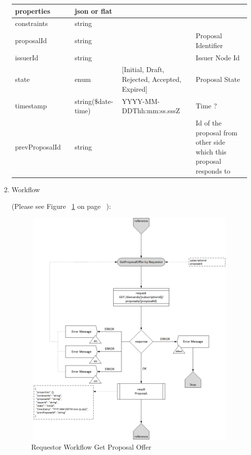 \begin{enumerate}
\begin{center}
\begin{tabular}{|p{3cm}|l|p{3cm}|p{3cm}|p{4cm}|}
properties	& 	& 	json or flat		&								&	 \\ 

\hline

constraints &	&	string				&								&	\\

\hline

proposalId	&	&	string				&								& Proposal Identifier \\

\hline

issuerId	&	&	string				&								& Issuer Node Id \\

\hline

state		&	&	enum				& [Initial, Draft, Rejected, Accepted, Expired] & Proposal State \\

\hline

timestamp	& 	& 	string(\$date-time)	&	YYYY-MM-DDThh:mm:ss.sssZ	&	Time ? \\ 

\hline

prevProposalId & &	string 				&								&	Id of the proposal from other side which this proposal responds to \\

\hline

\end{tabular}
\end{center}


\item Workflow

(Please see Figure ~\ref{fig:GPO} on page ~\pageref{fig:GPO}):

\begin{figure}[htbp]
    \centering
    \includegraphics[width=12cm,height=12cm,angle=0]{./diag/Workflow/Market/GetProposalOffer-R-Workflow.png}
    \caption{Requestor Workflow Get Proposal Offer }
	\label{fig:GPO}
\end{figure}


\end{enumerate}

